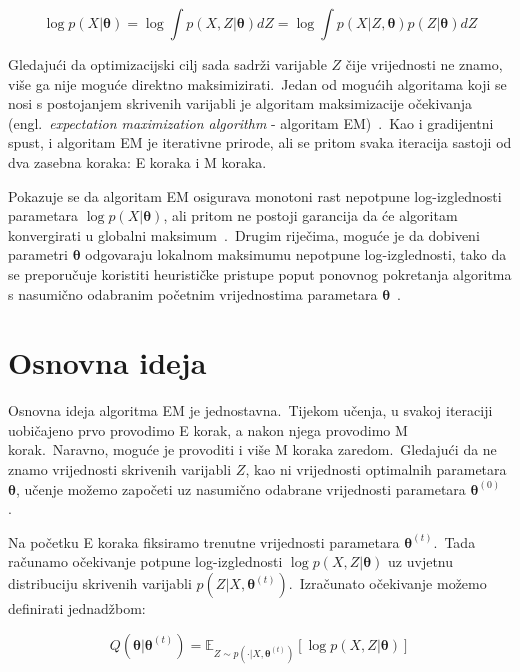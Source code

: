 \documentclass[diplomskirad]{fer}
\begin{document}
\begin{equation}
  \log p(X | \bm{\theta}) = \log \int p(X, Z | \bm{\theta}) dZ = \log \int p(X | Z, \bm{\theta}) p(Z |\bm{\theta}) dZ
  \label{eq:log_likelihood_latent}
\end{equation}

Gledajući da optimizacijski cilj sada sadrži varijable $Z$ čije vrijednosti ne znamo, više ga nije moguće direktno maksimizirati.\ 
Jedan od mogućih algoritama koji se nosi s postojanjem skrivenih varijabli je algoritam maksimizacije očekivanja (engl.\ \textit{expectation maximization algorithm} - algoritam EM)~\cite{moon1996expectation}.\ 
Kao i gradijentni spust, i algoritam EM je iterativne prirode, ali se pritom svaka iteracija sastoji od dva zasebna koraka: E koraka i M koraka.\ 
  
Pokazuje se da algoritam EM osigurava monotoni rast nepotpune log-izglednosti parametara $\log p(X | \bm{\theta})$, ali pritom ne postoji garancija da će algoritam konvergirati u globalni maksimum~\cite{wu1983convergence}.\
Drugim riječima, moguće je da dobiveni parametri $\bm{\theta}$ odgovaraju lokalnom maksimumu nepotpune log-izglednosti, tako da se preporučuje koristiti heurističke pristupe poput ponovnog pokretanja algoritma s nasumično odabranim početnim vrijednostima parametara $\bm{\theta}$~\cite{wu1983convergence}.\ 

\section{Osnovna ideja}
\label{sek:osnovni_em}

Osnovna ideja algoritma EM je jednostavna.\ Tijekom učenja, u svakoj iteraciji uobičajeno prvo provodimo E korak, a nakon njega provodimo M korak.\ Naravno, moguće je provoditi i više M koraka zaredom.\ 
Gledajući da ne znamo vrijednosti skrivenih varijabli $Z$, kao ni vrijednosti optimalnih parametara $\bm{\theta}$, učenje možemo započeti uz nasumično odabrane vrijednosti parametara $\bm{\theta}^{(0)}$.\ 
  
Na početku E koraka fiksiramo trenutne vrijednosti parametara $\bm{\theta}^{(t)}$.\ Tada računamo očekivanje potpune log-izglednosti $\log p(X, Z | \bm{\theta})$ uz uvjetnu distribuciju skrivenih varijabli $p(Z | X, \bm{\theta}^{(t)})$.\ 
Izračunato očekivanje možemo definirati jednadžbom:

\begin{equation}
  Q (\bm{\theta} | \bm{\theta}^{(t)}) = \mathbb{E}_{Z \sim p(\cdot | X, \bm{\theta}^{(t)})} \left[ \log p(X, Z | \bm{\theta}) \right]
  \label{eq:em_e_step_basic}
\end{equation}
\end{document}
